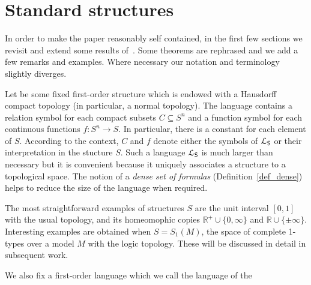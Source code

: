 \documentclass{amsproc}
\renewcommand*{\emph}[1]{%
   \smash{\tikz[baseline]\node[rectangle, fill=teal!25, rounded corners, inner xsep=0.5ex, inner ysep=0.2ex, anchor=base, minimum height = 2.7ex]{\strut #1};}}
\begin{document}
\section{Standard structures}\label{uno}

\def\ceq#1#2#3{\parbox[t]{23ex}{$\displaystyle #1$}\parbox{6ex}{\hfil $#2$}{$\displaystyle #3$}}

In order to make the paper reasonably self contained, in the first few sections we revisit and extend some results of~\cite{clcl}.
Some theorems are rephrased and we add a few remarks and examples.
Where necessary our notation and terminology slightly diverges.

Let \emph{$S$\/} be some fixed first-order structure which is endowed with a Hausdorff compact topology (in particular, a normal topology).
The language \emph{${\EuScript L}_{\sf S}$\/} contains a relation symbol for each compact subsets $C\subseteq S^n$ and a function symbol for each continuous functions $f:S^n\to S$.
In particular, there is a constant for each element of $S$.
According to the context, $C$ and $f$ denote either the symbols of ${\EuScript L}_{\sf S}$ or their interpretation in the stucture $S$.
Such a language ${\EuScript L}_{\sf S}$ is much larger than necessary but it is convenient because it uniquely associates a structure to a topological space.
The notion of a \textit{dense set of formulas\/} (Definition~\ref{def_dense}) helps to reduce the size of the language when required.

The most straightforward examples of structures $S$ are the unit interval $[0,1]$ with the usual topology, and its homeomophic copies $\mathds{R}^+\cup\{0,\infty\}$ and $\mathds{R}\cup\{\pm\infty\}$.
Interesting examples are obtained when $S=S_1(M)$, the space of complete 1-types over a model $M$ with the logic topology.
These will be discussed in detail in subsequent work.

We also fix a first-order language \emph{${\EuScript L}_{\sf H}$\/} which we call the language of the \emph{home sort.}
\end{document}
